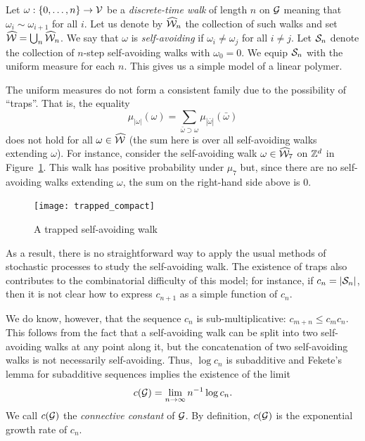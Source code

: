 \begin{example}
Let $\omega : \{0,\ldots,n\} \rightarrow \mathcal{V}$ be a \emph{discrete-time walk}
of length $n$ on $\mathcal{G}$ meaning that $\omega_i \sim \omega_{i+1}$ for all $i$. Let us
denote by $\widehat{\mathcal{W}}_n$ the collection of such walks and set $\widehat{\mathcal{W}} = \bigcup_n \widehat{\mathcal{W}}_n$.
We say that $\omega$ is \emph{self-avoiding} if $\omega_i \ne \omega_j$
for all $i \ne j$. Let $\mathcal{S}_n$ denote the collection of $n$-step
self-avoiding walks with $\omega_0 = 0$. We equip $\mathcal{S}_n$ with the uniform
measure for each $n$. This gives us a simple model of a linear polymer.

The uniform measures do not form a consistent family due to the possibility of ``traps''.
That is, the equality
\begin{equation}
\mu_{|\omega|}(\omega) = \sum_{\bar\omega \supset \omega} \mu_{|\bar\omega|}(\bar\omega)
\end{equation}
does not hold for all $\omega\in\widehat{\mathcal{W}}$ (the sum here is over all self-avoiding walks extending $\omega$).
For instance, consider the self-avoiding walk $\omega\in\widehat{\mathcal{W}}_7$
on ${ {{\mathbb Z}}^d }$ in Figure~\ref{fig:trap}. This walk has positive probability under $\mu_7$ but,
since there are no self-avoiding walks extending $\omega$, the sum on the 
right-hand side above is $0$.

\begin{figure}[!htb]
\label{fig:trap}
\centering
\caption{A trapped self-avoiding walk}
\texttt{[image: trapped\_compact]}
\end{figure}

As a result, there is no straightforward way to apply the usual methods of stochastic processes
to study the self-avoiding walk. The existence of traps also contributes to the
combinatorial difficulty of this model; for instance, if $c_n = |\mathcal{S}_n|$, then it is
not clear how to express $c_{n+1}$ as a simple function of $c_n$.

We do know, however, that the sequence $c_n$ is sub-multiplicative: $c_{m+n} \le c_m c_n$.
This follows from the fact that a self-avoiding walk can be split into two self-avoiding
walks at any point along it, but the concatenation of two self-avoiding walks is not
necessarily self-avoiding. Thus, $\log c_n$ is subadditive and
Fekete's lemma for subadditive sequences implies the existence of the limit
\begin{equation}
c(\mathcal{G}) = \lim_{n\rightarrow\infty} n^{-1} \log c_n.
\end{equation}
We call $c(\mathcal{G})$ the \emph{connective constant} of $\mathcal{G}$.
By definition, $c(\mathcal{G})$ is the exponential growth rate of $c_n$.
\end{example}

